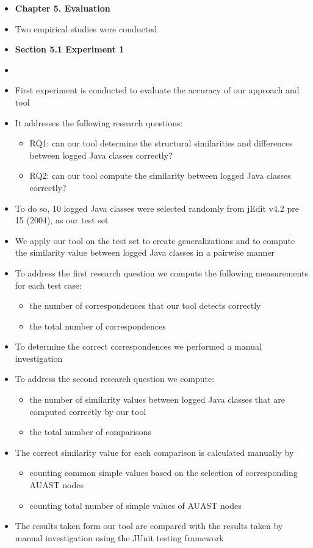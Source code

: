 \documentclass{article}
\newcommand{\bold}{\textbf}
\newcommand{\tsc}{\textsc}
\begin{document}
\begin{itemize} [leftmargin=.1in]
\item \bold{Chapter 5. Evaluation}
\item Two empirical studies were conducted
\item \bold{Section 5.1 Experiment 1}
\item {}  
\item First experiment is conducted to evaluate the accuracy of our approach and tool
\item It addresses the following research questions:
\begin{itemize}
\item \tsc{RQ1: }can our tool determine the structural similarities and differences between logged Java classes correctly?
\item \tsc{RQ2: }can our tool compute the similarity between logged Java classes correctly?
\end{itemize}
\item To do so, 10 logged Java classes were selected randomly from jEdit v4.2 pre 15 (2004), as our test set
\item We apply our tool on the test set to create generalizations  and to compute the similarity value between logged Java classes in a pairwise manner
\item To address the first research question we compute the following measurements for each test case:
\begin{itemize}
\item the number of correspondences that our tool detects correctly
\item the total number of correspondences
\end{itemize}
\item To determine the correct correspondences we performed a manual investigation
\item To address the second research question we compute:
\begin{itemize}
\item the number of similarity values between logged Java classes that are computed correctly by our tool
\item the total number of comparisons
\end{itemize}
\item The correct similarity value for each comparison is calculated manually by
\begin{itemize}
\item counting common simple values based on the selection of corresponding AUAST nodes
\item counting total number of simple values of AUAST nodes
\end{itemize}
\item The results taken form our tool are compared with the results taken by manual investigation using the JUnit testing framework


\end{itemize}
\end{document}
